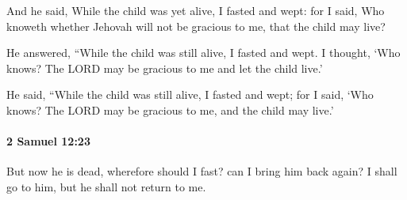 			\begin{versebox}
					\item[BHS] 
					\item[ASV] And he said, While the child was yet alive, I fasted and wept: for I said, Who knoweth whether Jehovah will not be gracious to me, that the child may live?
					\item[NIV] He answered, “While the child was still alive, I fasted and wept. I thought, ‘Who knows? The LORD may be gracious to me and let the child live.’
					\item[NRSV] He said, “While the child was still alive, I fasted and wept; for I said, ‘Who knows? The LORD may be gracious to me, and the child may live.’
			\end{versebox}

		\paragraph{2 Samuel 12:23} %
			\label{2SAMUEL-12-23}

			But now he is dead, wherefore should I fast? can I bring him back again? I shall go to him, but he shall not return to me.

